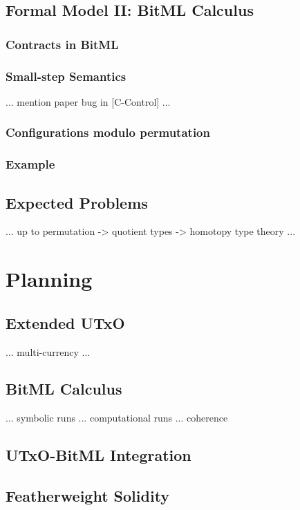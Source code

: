 \documentclass[acmsmall,nonacm=true,screen=true]{acmart}\settopmatter{printfolios=false,printccs=false,printacmref=false}
\begin{document}
\subsection{Formal Model II: BitML Calculus}
\subsubsection{Contracts in BitML}
\subsubsection{Small-step Semantics}
... mention paper bug in [C-Control] ...
\subsubsection{Configurations modulo permutation}
\subsubsection{Example}

\subsection{Expected Problems}
... up to permutation -> quotient types -> homotopy type theory ...

\section{Planning}
\label{sec:plan}

\subsection{Extended UTxO}
... multi-currency ... 

\subsection{BitML Calculus}
... symbolic runs ... computational runs ... coherence

\subsection{UTxO-BitML Integration}

\subsection{Featherweight Solidity}
\end{document}
